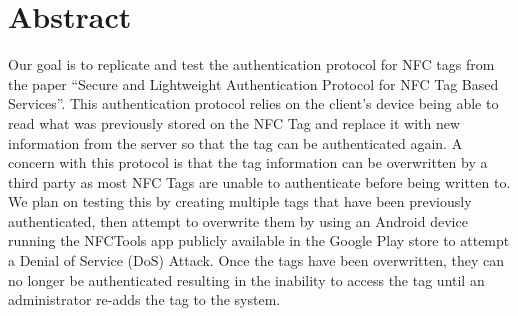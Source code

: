\section*{Abstract}

Our goal is to replicate and test the authentication protocol for NFC tags from the paper “Secure and Lightweight Authentication  Protocol for NFC Tag Based Services”. This authentication protocol relies on the client’s device being able to read what was previously stored on the NFC Tag and replace it with new information from the server so that the tag can be authenticated again. A concern with this protocol is that the tag information can be overwritten by a third party as most NFC Tags are unable to authenticate before being written to. We plan on testing this by creating multiple tags that have been previously authenticated, then attempt to overwrite them by using an Android device running the NFCTools app publicly available in the Google Play store to attempt a Denial of Service (DoS) Attack. Once the tags have been overwritten, they can no longer be authenticated resulting in the inability to access the tag until an administrator re-adds the tag to the system.